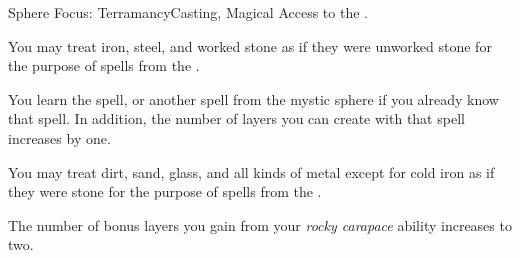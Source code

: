     \begin{magicalfeat}{Sphere Focus: Terramancy}{Casting, Magical}
        \featpre Access to the  .

         You may treat iron, steel, and worked stone as if they were unworked stone for the purpose of spells from the  .

         You learn the  spell, or another spell from the  mystic sphere if you already know that spell.
        In addition, the number of layers you can create with that spell increases by one.

         You may treat dirt, sand, glass, and all kinds of metal except for cold iron as if they were stone for the purpose of spells from the  .

         The number of bonus layers you gain from your \textit{rocky carapace} ability increases to two.
    \end{magicalfeat}

